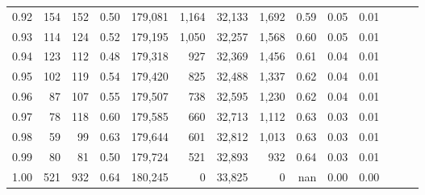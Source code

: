 \begin{tabular}{rrrrrrrrrrrrrr}
0.92 &    154 &  152 &  0.50 &  179,081 &    1,164 &  32,133 &   1,692 &  0.59 &  0.05 &      0.01 \\
0.93 &    114 &  124 &  0.52 &  179,195 &    1,050 &  32,257 &   1,568 &  0.60 &  0.05 &      0.01 \\
0.94 &    123 &  112 &  0.48 &  179,318 &      927 &  32,369 &   1,456 &  0.61 &  0.04 &      0.01 \\
0.95 &    102 &  119 &  0.54 &  179,420 &      825 &  32,488 &   1,337 &  0.62 &  0.04 &      0.01 \\
0.96 &     87 &  107 &  0.55 &  179,507 &      738 &  32,595 &   1,230 &  0.62 &  0.04 &      0.01 \\
0.97 &     78 &  118 &  0.60 &  179,585 &      660 &  32,713 &   1,112 &  0.63 &  0.03 &      0.01 \\
0.98 &     59 &   99 &  0.63 &  179,644 &      601 &  32,812 &   1,013 &  0.63 &  0.03 &      0.01 \\
0.99 &     80 &   81 &  0.50 &  179,724 &      521 &  32,893 &     932 &  0.64 &  0.03 &      0.01 \\
1.00 &    521 &  932 &  0.64 &  180,245 &        0 &  33,825 &       0 &   nan &  0.00 &      0.00 \\
\bottomrule
\end{tabular}

